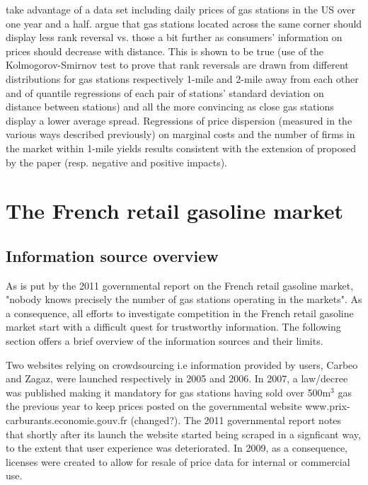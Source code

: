 \documentclass[11pt]{article}
\begin{document}
\cite{TAP11} take advantage of a data set including daily prices of gas stations in the US over one year and a half. \cite{TAP11} argue that gas stations located across the same corner should display less rank reversal vs. those a bit further as consumers' information on prices should decrease with distance. This is shown to be true (use of the Kolmogorov-Smirnov test to prove that rank reversals are drawn from different distributions for gas stations respectively 1-mile and 2-mile away from each other and of quantile regressions of each pair of stations' standard deviation on distance between stations) and all the more convincing as close gas stations display a lower average spread. Regressions of price dispersion (measured in the various ways described previously) on marginal costs and the number of firms in the market within 1-mile yields results consistent with the extension of \cite{VAR80} proposed by the paper (resp. negative and positive impacts).

\section{The French retail gasoline market}

\subsection{Information source overview}

As is put by the 2011 governmental report on the French retail gasoline market, "nobody knows precisely the number of gas stations operating in the markets". As a consequence, all efforts to investigate competition in the French retail gasoline market start with a difficult quest for trustworthy information. The following section offers a brief overview of the information sources and their limits.

Two websites relying on crowdsourcing i.e information provided by users, Carbeo and Zagaz, were launched respectively in 2005 and 2006. In 2007, a law/decree was published making it mandatory for gas stations having sold over 500m$^{3}$ gas the previous year to keep prices posted on the governmental website www.prix-carburants.economie.gouv.fr (changed?). The 2011 governmental report notes that shortly after its launch the website started being scraped in a signficant way, to the extent that user experience was deteriorated. In 2009, as a consequence, licenses were created to allow for resale of price data for internal or commercial use.
\end{document}
